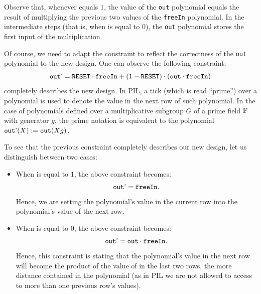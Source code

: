 Observe that, whenever \RESET equals $1$, the value of the \texttt{out} polynomial equals the result of multiplying the previous two values of the \texttt{freeIn} polynomial. In the intermediate steps (that is, when \RESET is equal to $0$), the \texttt{out} polynomial stores the first input of the multiplication. 

Of course, we need to adapt the \Multiplier constraint to reflect the correctness of the \texttt{out} polynomial to the new design. One can observe the following constraint:
\[
\mathtt{out}\textsf{'} = \mathtt{RESET} \cdot \mathtt{freeIn} + (1 - \mathtt{RESET}) \cdot (\mathtt{out} \cdot \mathtt{freeIn})
\]
completely describes the new design. In PIL, a tick \nextStep{} (which is read ``prime'') over a polynomial is used to denote the value in the next row of such polynomial. In the case of polynomials defined over a multiplicative subgroup $G$ of a prime field $\mathbb{F}$ with generator $g$, the prime notation is equivalent to the polynomial $\mathtt{out}\textsf{'}(X):= \mathtt{out}(Xg)$.

To see that the previous constraint completely describes our new \Multiplier design, let us distinguish between two cases: 
\begin{itemize}
    \item When \RESET is equal to $1$, the above constraint becomes:
    \[
    \mathtt{out}\textsf{'} = \mathtt{freeIn}.
    \]
    Hence, we are setting the \freeIn polynomial's value in the current row into the \out polynomial's value of the next row.
    
    \item When \RESET is equal to $0$, the above constraint becomes:
    \[
    \mathtt{out}\textsf{'} = \mathtt{out} \cdot \mathtt{freeIn}.
    \]
    Hence, this constraint is stating that the \out polynomial's value in the next row will become the product of the value of \freeIn in the last two rows, the more distance contained in the \out polynomial (as in PIL we are not allowed to access to more than one previous row's values). 
\end{itemize}

